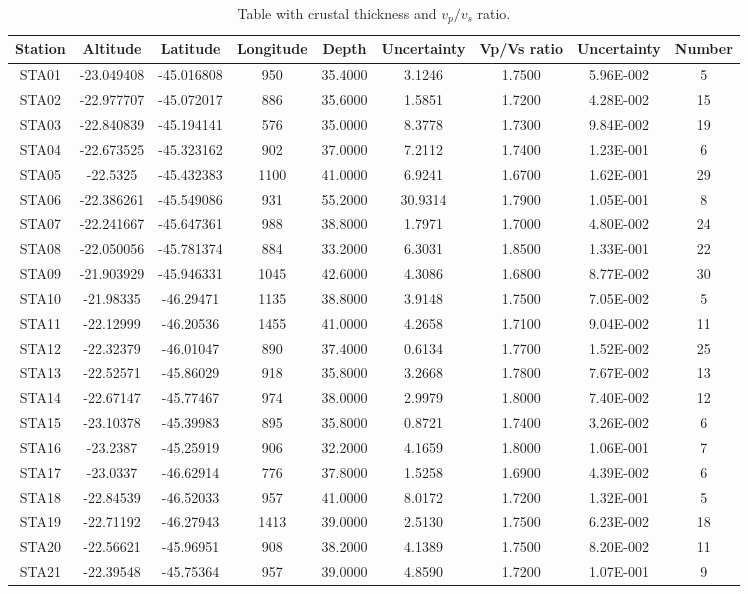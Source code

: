 \documentclass[twoside,letterpaper,twocolumn]{article}
\begin{document}
\begin{table}[!ht]
\caption{Table with crustal thickness and $v_{p}/v_{s}$ ratio.}
\begin{center}
\begin{tabular}{| c | c | c | c | c | c | c | c | c |}
\toprule
{\textbf{Station}} & {\textbf{Altitude}} & {\textbf{Latitude}} & {\textbf{Longitude}} & {\textbf{Depth}} & {\textbf{Uncertainty}} & {\textbf{Vp/Vs ratio}} & {\textbf{Uncertainty}} & {\textbf{Number}}\\
\bottomrule
STA01 & -23.049408 & -45.016808 & 950 & 35.4000 & 3.1246 & 1.7500 & 5.96E-002 & 5\\
STA02 & -22.977707 & -45.072017 & 886 & 35.6000 & 1.5851 & 1.7200 & 4.28E-002 & 15\\
STA03 & -22.840839 & -45.194141 & 576 & 35.0000 & 8.3778 & 1.7300 & 9.84E-002 & 19\\
STA04 & -22.673525 & -45.323162 & 902 & 37.0000 & 7.2112 & 1.7400 & 1.23E-001 & 6\\
STA05 & -22.5325 & -45.432383 & 1100 & 41.0000 & 6.9241 & 1.6700 & 1.62E-001 & 29\\
STA06 & -22.386261 & -45.549086 & 931 & 55.2000 & 30.9314 & 1.7900 & 1.05E-001 & 8\\
STA07 & -22.241667 & -45.647361 & 988 & 38.8000 & 1.7971 & 1.7000 & 4.80E-002 & 24\\
STA08 & -22.050056 & -45.781374 & 884 & 33.2000 & 6.3031 & 1.8500 & 1.33E-001 & 22\\
STA09 & -21.903929 & -45.946331 & 1045 & 42.6000 & 4.3086 & 1.6800 & 8.77E-002 & 30\\
STA10 & -21.98335 & -46.29471 & 1135 & 38.8000 & 3.9148 & 1.7500 & 7.05E-002 & 5\\
STA11 & -22.12999 & -46.20536 & 1455 & 41.0000 & 4.2658 & 1.7100 & 9.04E-002 & 11\\
STA12 & -22.32379 & -46.01047 & 890 & 37.4000 & 0.6134 & 1.7700 & 1.52E-002 & 25\\
STA13 & -22.52571 & -45.86029 & 918 & 35.8000 & 3.2668 & 1.7800 & 7.67E-002 & 13\\
STA14 & -22.67147 & -45.77467 & 974 & 38.0000 & 2.9979 & 1.8000 & 7.40E-002 & 12\\
STA15 & -23.10378 & -45.39983 & 895 & 35.8000 & 0.8721 & 1.7400 & 3.26E-002 & 6\\
STA16 & -23.2387 & -45.25919 & 906 & 32.2000 & 4.1659 & 1.8000 & 1.06E-001 & 7\\
STA17 & -23.0337 & -46.62914 & 776 & 37.8000 & 1.5258 & 1.6900 & 4.39E-002 & 6\\
STA18 & -22.84539 & -46.52033 & 957 & 41.0000 & 8.0172 & 1.7200 & 1.32E-001 & 5\\
STA19 & -22.71192 & -46.27943 & 1413 & 39.0000 & 2.5130 & 1.7500 & 6.23E-002 & 18\\
STA20 & -22.56621 & -45.96951 & 908 & 38.2000 & 4.1389 & 1.7500 & 8.20E-002 & 11\\
STA21 & -22.39548 & -45.75364 & 957 & 39.0000 & 4.8590 & 1.7200 & 1.07E-001 & 9\\
\hline
\end{tabular}
\label{tabela}
\end{center}
\end{table}
\end{document}
